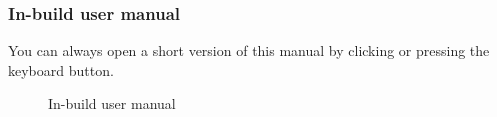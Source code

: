 \documentclass[a5paper, 10pt]{article}
\begin{document}
        \subsubsection{In-build user manual}
            You can always open a short version of this manual by clicking  or pressing the  keyboard button.
            \begin{figure}[h]
                \centering
                \caption{In-build user manual}
                \label{pic:"in-build_use_manual"}
            \end{figure}
\end{document}
